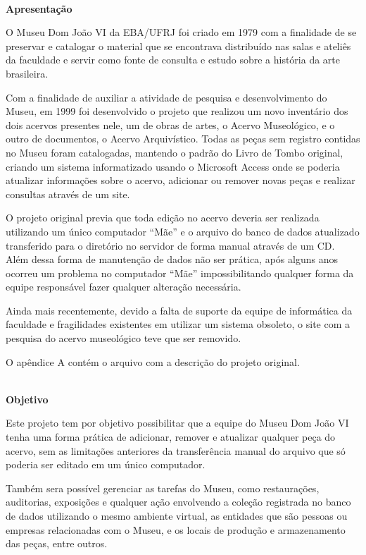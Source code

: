 \documentclass[a4paper,12pt,oneside,onecolumn,final,fleqn]{repUERJ}
\begin{document}
$\!$\\
\textbf{Apresentação}

\vspace{10pt}

O Museu Dom João VI da EBA/UFRJ foi criado em 1979 com a finalidade de se preservar e catalogar o material que se encontrava distribuído nas salas e ateliês da faculdade e servir como fonte de consulta e estudo sobre a história da arte brasileira. 

Com a finalidade de auxiliar a atividade de pesquisa e desenvolvimento do Museu, em 1999 foi desenvolvido o projeto que realizou um novo inventário dos dois acervos presentes nele, um de obras de artes, o Acervo Museológico, e o outro de documentos, o Acervo Arquivístico. Todas as peças sem registro contidas no Museu foram catalogadas, mantendo o padrão do Livro de Tombo original, criando um sistema informatizado usando o Microsoft Access onde se poderia atualizar informações sobre o acervo, adicionar ou remover novas peças e realizar consultas através de um site.

O projeto original previa que toda edição no acervo deveria ser realizada utilizando um único computador ``Mãe'' e o arquivo do banco de dados atualizado transferido para o diretório no servidor de forma manual através de um CD. Além dessa forma de manutenção de dados não ser prática, após alguns anos ocorreu um problema no computador ``Mãe'' impossibilitando qualquer forma da equipe responsável fazer qualquer alteração necessária. 

Ainda mais recentemente, devido a falta de suporte da equipe de informática da faculdade e fragilidades existentes em utilizar um sistema obsoleto, o site com a pesquisa do acervo museológico teve que ser removido.

O apêndice A contém o arquivo com a descrição do projeto original.

\vspace{10pt}
$\!$\\
\textbf{Objetivo}
\vspace{10pt}

Este projeto tem por objetivo possibilitar que a equipe do Museu Dom João VI tenha uma forma prática de adicionar, remover e atualizar qualquer peça do acervo, sem as limitações anteriores da transferência manual do arquivo que só poderia ser editado em um único computador.

Também sera possível gerenciar as tarefas do Museu, como restaurações, auditorias, exposições e qualquer ação envolvendo a coleção registrada no banco de dados utilizando o mesmo ambiente virtual, as entidades que são pessoas ou empresas relacionadas com o Museu, e os locais de produção e armazenamento das peças, entre outros.
\end{document}

